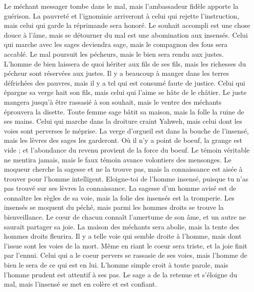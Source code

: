 \begin{multicols}{2}
Le méchant messager tombe dans le mal, mais l'ambassadeur fidèle apporte la guérison.
La pauvreté et l'ignominie arriveront à celui qui rejette l'instruction, mais celui qui garde la réprimande sera honoré.
Le souhait accompli est une chose douce à l'âme, mais se détourner du mal est une abomination aux insensés.
Celui qui marche avec les sages deviendra sage, mais le compagnon des fous sera accablé.
Le mal poursuit les pécheurs, mais le bien sera rendu aux justes.
L'homme de bien laissera de quoi hériter aux fils de ses fils, mais les richesses du pécheur sont réservées aux justes.
Il y a beaucoup à manger dans les terres défrichées des pauvres, mais il y a tel qui est consumé faute de justice.
Celui qui épargne sa verge hait son fils, mais celui qui l'aime se hâte de le châtier.
Le juste mangera jusqu'à être rassasié à son souhait, mais le ventre des méchants éprouvera la disette.
\VerseOne{}Toute femme sage bâtit sa maison, mais la folle la ruine de ses mains.
Celui qui marche dans la droiture craint Yahweh, mais celui dont les voies sont perverses le méprise.
La verge d'orgueil est dans la bouche de l’insensé, mais les lèvres des sages les garderont.
Où il n'y a point de boeuf, la grange est vide ; et l'abondance du revenu provient de la force du boeuf.
Le témoin véritable ne mentira jamais, mais le faux témoin avance volontiers des mensonges.
Le moqueur cherche la sagesse et ne la trouve pas, mais la connaissance est aisée à trouver pour l'homme intelligent.
Eloigne-toi de l'homme insensé, puisque tu n’as pas trouvé sur ses lèvres la connaissance.
La sagesse d’un homme avisé est de connaître les règles de sa voie, mais la folie des insensés est la tromperie.
Les insensés se moquent du péché, mais parmi les hommes droits se trouve la bienveillance.
Le cœur de chacun connaît l'amertume de son âme, et un autre ne saurait partager sa joie.
La maison des méchants sera abolie, mais la tente des hommes droits fleurira.
Il y a telle voie qui semble droite à l'homme, mais dont l'issue sont les voies de la mort.
Même en riant le coeur sera triste, et la joie finit par l'ennui.
Celui qui a le coeur pervers se rassasie de ses voies, mais l'homme de bien le sera de ce qui est en lui.
L’homme simple croit à toute parole, mais l'homme prudent est attentif à ses pas.
Le sage a de la retenue et s’éloigne du mal, mais l’insensé se met en colère et est confiant.

\end{multicols}
